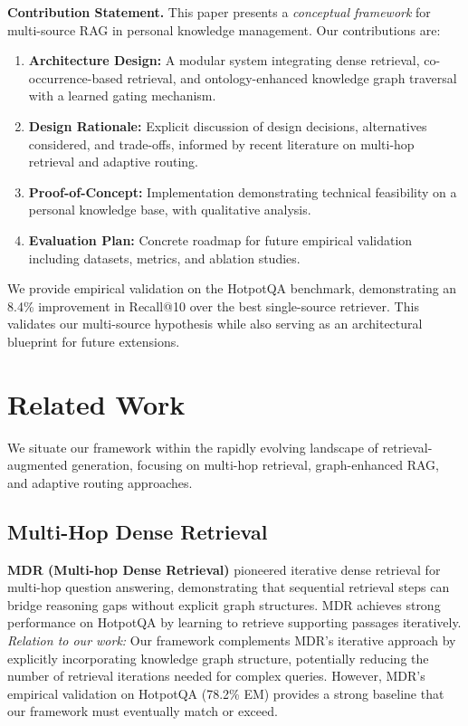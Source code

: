 \documentclass[11pt,a4paper]{article}
\begin{document}
\textbf{Contribution Statement.} This paper presents a \textit{conceptual framework} for multi-source RAG in personal knowledge management. Our contributions are:

\begin{enumerate}
    \item \textbf{Architecture Design:} A modular system integrating dense retrieval, co-occurrence-based retrieval, and ontology-enhanced knowledge graph traversal with a learned gating mechanism.
    
    \item \textbf{Design Rationale:} Explicit discussion of design decisions, alternatives considered, and trade-offs, informed by recent literature on multi-hop retrieval and adaptive routing.
    
    \item \textbf{Proof-of-Concept:} Implementation demonstrating technical feasibility on a personal knowledge base, with qualitative analysis.
    
    \item \textbf{Evaluation Plan:} Concrete roadmap for future empirical validation including datasets, metrics, and ablation studies.
\end{enumerate}

We provide empirical validation on the HotpotQA benchmark, demonstrating an 8.4\% improvement in Recall@10 over the best single-source retriever. This validates our multi-source hypothesis while also serving as an architectural blueprint for future extensions.

\section{Related Work}
\label{sec:related_work}

We situate our framework within the rapidly evolving landscape of retrieval-augmented generation, focusing on multi-hop retrieval, graph-enhanced RAG, and adaptive routing approaches.

\subsection{Multi-Hop Dense Retrieval}

\textbf{MDR (Multi-hop Dense Retrieval)} \citep{xiong2021answering} pioneered iterative dense retrieval for multi-hop question answering, demonstrating that sequential retrieval steps can bridge reasoning gaps without explicit graph structures. MDR achieves strong performance on HotpotQA by learning to retrieve supporting passages iteratively. \textit{Relation to our work:} Our framework complements MDR's iterative approach by explicitly incorporating knowledge graph structure, potentially reducing the number of retrieval iterations needed for complex queries. However, MDR's empirical validation on HotpotQA (78.2\% EM) provides a strong baseline that our framework must eventually match or exceed.
\end{document}
